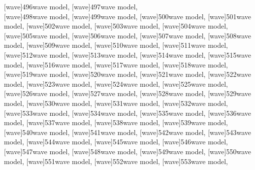 \documentclass[a4paper,11pt]{article}
\begin{document}
[wave]{496}{wave model},
[wave]{497}{wave model}, \\[0.7em]
[wave]{498}{wave model},
[wave]{499}{wave model},
[wave]{500}{wave model},
[wave]{501}{wave model},
[wave]{502}{wave model},
[wave]{503}{wave model},
[wave]{504}{wave model}, \\[0.7em]
[wave]{505}{wave model},
[wave]{506}{wave model},
[wave]{507}{wave model},
[wave]{508}{wave model},
[wave]{509}{wave model},
[wave]{510}{wave model},
[wave]{511}{wave model}, \\[0.7em]
[wave]{512}{wave model},
[wave]{513}{wave model},
[wave]{514}{wave model},
[wave]{515}{wave model},
[wave]{516}{wave model},
[wave]{517}{wave model},
[wave]{518}{wave model}, \\[0.7em]
[wave]{519}{wave model},
[wave]{520}{wave model},
[wave]{521}{wave model},
[wave]{522}{wave model},
[wave]{523}{wave model},
[wave]{524}{wave model},
[wave]{525}{wave model}, \\[0.7em]
[wave]{526}{wave model},
[wave]{527}{wave model},
[wave]{528}{wave model},
[wave]{529}{wave model},
[wave]{530}{wave model},
[wave]{531}{wave model},
[wave]{532}{wave model}, \\[0.7em]
[wave]{533}{wave model},
[wave]{534}{wave model},
[wave]{535}{wave model},
[wave]{536}{wave model},
[wave]{537}{wave model},
[wave]{538}{wave model},
[wave]{539}{wave model}, \\[0.7em]
[wave]{540}{wave model},
[wave]{541}{wave model},
[wave]{542}{wave model},
[wave]{543}{wave model},
[wave]{544}{wave model},
[wave]{545}{wave model},
[wave]{546}{wave model}, \\[0.7em]
[wave]{547}{wave model},
[wave]{548}{wave model},
[wave]{549}{wave model},
[wave]{550}{wave model},
[wave]{551}{wave model},
[wave]{552}{wave model},
[wave]{553}{wave model},
\end{document}
